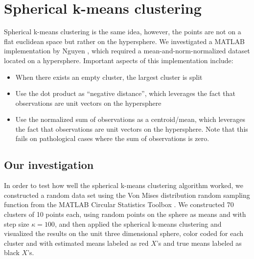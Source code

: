 \documentclass[../tech_report_1.tex]{subfiles}
\begin{document}
\section{Spherical k-means clustering}

Spherical k-means clustering is the same idea, however, the points are not on a flat euclidean space but rather on the hypersphere.
We investigated a MATLAB implementation by Nguyen \cite{nguyen2008gene,nguyen_spherical_clustering},
which required a mean-and-norm-normalized dataset located on a hypersphere.
Important aspects of this implementation include:
\begin{itemize}
\item When there exists an empty cluster, the largest cluster is split
\item Use the dot product as ``negative distance'', which leverages the
fact that observations are unit vectors on the hypersphere
\item Use the normalized sum of observations as a centroid/mean, which leverages
the fact that observations are unit vectors on the hypersphere. Note
that this fails on pathological cases where the sum of observations
is zero.
\end{itemize}

\subsection{Our investigation}

In order to test how well the spherical k-means clustering algorithm
worked, we constructed a random data set using the Von Mises distribution
random sampling function from the MATLAB Circular Statistics Toolbox \cite{circstats}.
We constructed 70 clusters of 10 points each, using random points
on the sphere as means and with step size $\kappa=100$, and then applied the spherical k-means clustering and visualized the results on the unit
three dimensional sphere, color coded for each cluster and with estimated
means labeled as red $X$'s and true means labeled as black $X$'s.
\end{document}
